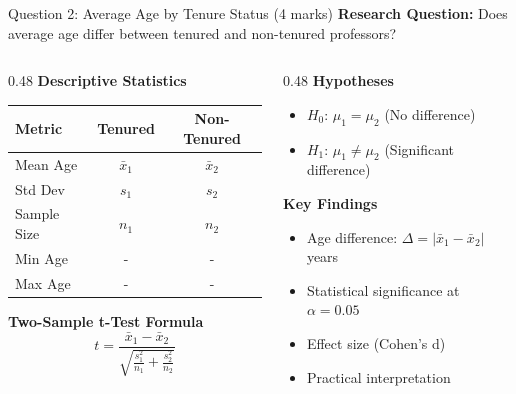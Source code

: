 \documentclass[aspectratio=169]{beamer}
\begin{document}
\begin{frame}{Question 2: Average Age by Tenure Status (4 marks)}
    \textbf{Research Question:} Does average age differ between tenured and non-tenured professors?

    \vspace{0.3cm}

    \begin{columns}[T]
        \begin{column}{0.48\textwidth}
            \textbf{Descriptive Statistics}

            \begin{table}[h]
                \centering
                \footnotesize
                \begin{tabular}{lcc}
                    \toprule
                    \textbf{Metric} & \textbf{Tenured} & \textbf{Non-Tenured} \\
                    \midrule
                    Mean Age & $\bar{x}_1$ & $\bar{x}_2$ \\
                    Std Dev & $s_1$ & $s_2$ \\
                    Sample Size & $n_1$ & $n_2$ \\
                    Min Age & - & - \\
                    Max Age & - & - \\
                    \bottomrule
                \end{tabular}
            \end{table}

            \vspace{0.3cm}

            \textbf{Two-Sample t-Test Formula}
            \[
            t = \frac{\bar{x}_1 - \bar{x}_2}{\sqrt{\frac{s_1^2}{n_1} + \frac{s_2^2}{n_2}}}
            \]
        \end{column}

        \begin{column}{0.48\textwidth}
            \textbf{Hypotheses}
            \begin{itemize}
                \item $H_0$: $\mu_1 = \mu_2$ (No difference)
                \item $H_1$: $\mu_1 \neq \mu_2$ (Significant difference)
            \end{itemize}

            \vspace{0.3cm}

            \textbf{Key Findings}
            \begin{itemize}
                \item Age difference: $\Delta = |\bar{x}_1 - \bar{x}_2|$ years
                \item Statistical significance at $\alpha = 0.05$
                \item Effect size (Cohen's d)
                \item Practical interpretation
            \end{itemize}


\end{column}
\end{columns}
\end{frame}
\end{document}
